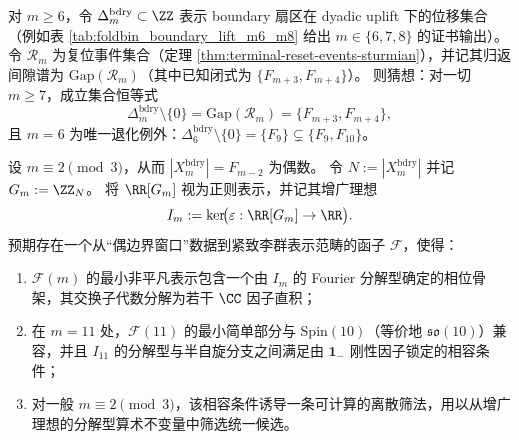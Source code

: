 \begin{conjecture}\label{conj:bdry-uplift-delta-equals-reset-gaps}
对 \(m\ge 6\)，令 \(\Delta_m^{\mathrm{bdry}}\subset\ZZ\) 表示 boundary 扇区在 dyadic uplift 下的位移集合（例如表 \ref{tab:foldbin_boundary_lift_m6_m8} 给出 \(m\in\{6,7,8\}\) 的证书输出）。
令 \(\mathcal R_m\) 为复位事件集合（定理 \ref{thm:terminal-reset-events-sturmian}），并记其归返间隙谱为 \(\mathrm{Gap}(\mathcal R_m)\)（其中已知闭式为 \(\{F_{m+3},F_{m+4}\}\)）。
则猜想：对一切 \(m\ge 7\)，成立集合恒等式
\[
\Delta_m^{\mathrm{bdry}}\setminus\{0\}=\mathrm{Gap}(\mathcal R_m)=\{F_{m+3},F_{m+4}\},
\]
且 \(m=6\) 为唯一退化例外：\(\Delta_6^{\mathrm{bdry}}\setminus\{0\}=\{F_9\}\subsetneq \{F_9,F_{10}\}\)。
\end{conjecture}

\begin{conjecture}[偶边界窗口的增广理想与统一候选的函子化匹配公理]\label{conj:profinite-gut-augmentation-ideal-functor}
设 \(m\equiv 2\pmod 3\)，从而 \(|X_m^{\mathrm{bdry}}|=F_{m-2}\) 为偶数。
令 \(N:=|X_m^{\mathrm{bdry}}|\) 并记 \(G_m:=\ZZ_N\)。
将 \(\RR[G_m]\) 视为正则表示，并记其增广理想
\[
I_m:=\ker\!\bigl(\varepsilon:\RR[G_m]\to\RR\bigr).
\]
预期存在一个从“偶边界窗口”数据到紧致李群表示范畴的函子 \(\mathcal F\)，使得：
\begin{enumerate}
  \item \(\mathcal F(m)\) 的最小非平凡表示包含一个由 \(I_m\) 的 Fourier 分解型确定的相位骨架，其交换子代数分解为若干 \(\CC\) 因子直积；
  \item 在 \(m=11\) 处，\(\mathcal F(11)\) 的最小简单部分与 \(\mathrm{Spin}(10)\)（等价地 \(\mathfrak{so}(10)\)）兼容，并且 \(I_{11}\) 的分解型与半自旋分支之间满足由 \(\mathbf 1_{-}\) 刚性因子锁定的相容条件；
  \item 对一般 \(m\equiv 2\pmod 3\)，该相容条件诱导一条可计算的离散筛法，用以从增广理想的分解型算术不变量中筛选统一候选。
\end{enumerate}
\end{conjecture}

\endinput
